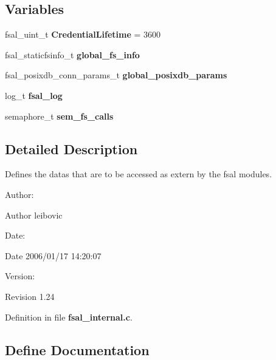 \subsection*{Variables}
\begin{CompactItemize}
\item 
fsal\_\-uint\_\-t {\bf Credential\-Lifetime} = 3600\label{fsal__internal_8c_a4}

\item 
fsal\_\-staticfsinfo\_\-t {\bf global\_\-fs\_\-info}\label{fsal__internal_8c_a5}

\item 
fsal\_\-posixdb\_\-conn\_\-params\_\-t {\bf global\_\-posixdb\_\-params}\label{fsal__internal_8c_a6}

\item 
log\_\-t {\bf fsal\_\-log}\label{fsal__internal_8c_a8}

\item 
semaphore\_\-t {\bf sem\_\-fs\_\-calls}\label{fsal__internal_8c_a10}

\end{CompactItemize}


\subsection{Detailed Description}
Defines the datas that are to be accessed as extern by the fsal modules. 

\begin{Desc}
\item[Author:]\begin{Desc}
\item[Author]leibovic \end{Desc}
\end{Desc}
\begin{Desc}
\item[Date:]\begin{Desc}
\item[Date]2006/01/17 14:20:07 \end{Desc}
\end{Desc}
\begin{Desc}
\item[Version:]\begin{Desc}
\item[Revision]1.24 \end{Desc}
\end{Desc}


Definition in file {\bf fsal\_\-internal.c}.

\subsection{Define Documentation}

